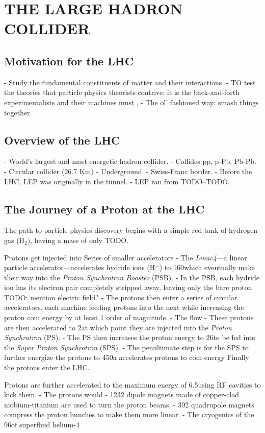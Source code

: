 \chapter{THE LARGE HADRON COLLIDER}

\section{Motivation for the LHC}
- Study the fundamental constituents of matter and their interactions.
- TO test the theories that particle physics theorists contrive:
it is the back-and-forth experimentalists and their machines must , 
- The ol' fashioned way: smash things together.

\section{Overview of the LHC}
- World's largest and most energetic hadron collider.
- Collides pp, p-Pb, Pb-Pb.
- Circular collider (26.7 Km)
- Underground.
- Swiss-Franc border.
- Before the LHC, LEP was originally in the tunnel.
    - LEP ran from TODO--TODO.

\section{The Journey of a Proton at the LHC}
The path to particle physics discovery begins with a simple red tank of hydrogen gas (H$_2$), having a mass of only TODO\Kg.

Protons get injected into Series of smaller accelerators
    - The \emph{Linac4}---a linear particle accelerator---accelerates hydride ions (H$^-$) to 160\MeV which eventually make their way into the \emph{Proton Synchrotron Booster} (PSB).
    - In the PSB, each hydride ion has its electron pair completely stripped away, leaving only the bare proton TODO: mention electric field?
    - The protons then enter a series of circular accelerators, each machine feeding protons into the next while increasing the proton com energy by at least 1 order of magnitude.
    - The flow 
    - These protons are then accelerated to 2\GeV at which point they are injected into the \emph{Proton Synchrotron} (PS).
    - The PS then increases the proton energy to 26\GeV to be fed into the \emph{Super Proton Synchrotron} (SPS).
    - The penultimate step is for the SPS to further energize the protons to 450\GeV a accelerates protons to com energy
Finally the protons enter the LHC.

Protons are further accelerated to the maximum energy of 6.5\TeV using RF cavities to kick them.
- The protons would 
- 1232 dipole magnets made of copper-clad niobium-titanium are used to turn the proton beams.
- 392 quadrupole magnets compress the proton bunches to make them more linear.
- The cryogenics of the 96\tonne of superfluid helium-4

